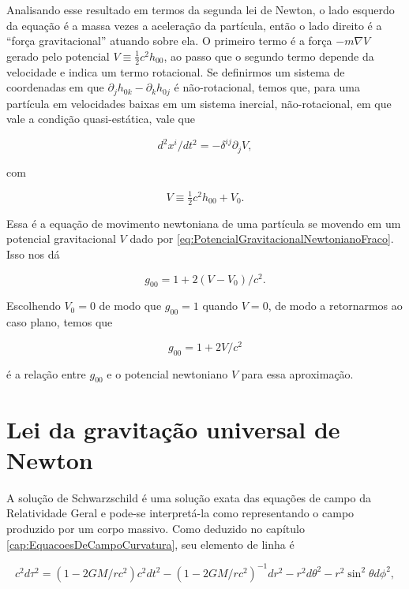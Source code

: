 Analisando esse resultado em termos da segunda lei de Newton, o lado esquerdo da equação é a massa vezes a aceleração da partícula, então o lado direito é a ``força gravitacional'' atuando sobre ela. O primeiro termo é a força $ -m \nabla V $ gerado pelo potencial $ V \equiv \tfrac{1}{2} c^{2} h_{00} $, ao passo que o segundo termo depende da velocidade e indica um termo rotacional. Se definirmos um sistema de coordenadas em que $ \partial_{j} h_{0 k}-\partial_{k} h_{0 j} $ é não-rotacional, temos que, para uma partícula em velocidades baixas em um sistema inercial, não-rotacional, em que vale a condição quasi-estática, vale que

\begin{equation}\label{eq:EquacaoMovimentoPotencial}
d^{2} x^{i} / d t^{2}=-\delta^{i j} \partial_{j} V,
\end{equation}

com

\begin{equation}\label{eq:PotencialGravitacionalNewtonianoFraco}
V \equiv \tfrac{1}{2} c^{2} h_{00}+V_0.
\end{equation}

Essa é a equação de movimento newtoniana de uma partícula se movendo em um potencial gravitacional $ V $ dado por \eqref{eq:PotencialGravitacionalNewtonianoFraco}. Isso nos dá

\[
g_{00}=1+ 2(V-V_0) / c^{2}.
\]

Escolhendo $ V_0=0 $ de modo que $ g_{00} = 1 $ quando $ V=0 $, de modo a retornarmos ao caso plano, temos que

\begin{equation}\label{eq:RelacaoG00Potencial}
\boxed{
g_{00}=1+2 V / c^{2}}
\end{equation}

é a relação entre $ g_{00} $ e o potencial newtoniano $ V $ para essa aproximação.

\section{Lei da gravitação universal de Newton}\label{sec:GravitacaoNewton}

A solução de Schwarzschild é uma solução exata das equações de campo da Relatividade Geral e pode-se interpretá-la como representando o campo produzido por um corpo massivo. Como deduzido no capítulo \ref{cap:EquacoesDeCampoCurvatura}, seu elemento de linha é

\[c^{2} d \tau^{2}=\left(1-2 G M / r c^{2}\right) c^{2} d t^{2}-\left(1-2 G M / r c^{2}\right)^{-1} d r^{2}-r^{2} d \theta^{2}-r^{2} \sin ^{2} \theta d \phi^{2},\]

